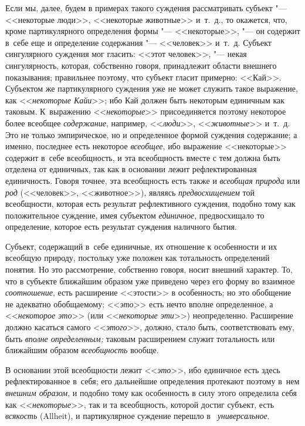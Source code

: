 Если мы, далее, будем в примерах такого суждения рассматривать субъект "---
<<некоторые люди>>, <<некоторые животные>> и~т.~д., то окажется, что, кроме
партикулярного определения формы "--- <<некоторые>>, "--- он содержит в~себе
еще и определение содержания "--- <<человек>> и~т.~д. Субъект сингулярного
суждения мог гласить: <<этот человек>>, "--- некая сингулярность, которая,
собственно говоря, принадлежит области внешнего показывания; правильнее
поэтому, что субъект гласит примерно: <<Кай>>. Субъектом же партикулярного
суждения уже не может служить такое выражение, как <<{\em некоторые Кайи}>>;
ибо Кай должен быть некоторым единичным как таковым. К~выражению
<<{\em некоторые}>> присоединяется поэтому некоторое более всеобщее
{\em содержание}, например, <<{\em люди}>>, <<{\em животные}>> и~т.~д. Это
не только эмпирическое, но и определенное формой суждения содержание; а именно,
последнее есть некоторое {\em всеобщее}, ибо выражение <<некоторые>> содержит
в~себе всеобщность, и эта всеобщность вместе с тем должна быть отделена от
единичных, так как в основании лежит рефлектированная единичность. Говоря
точнее, эта всеобщность есть также и {\em всеобщая природа} или {\em род}
(<<человек>>, <<животное>>), являясь {\em предвосхищением} той всеобщности,
которая есть результат рефлективного суждения, подобно тому как положительное
суждение, имея субъектом {\em единичное}, предвосхищало то определение, которое
есть результат суждения наличного бытия.

Субъект, содержащий в~себе единичные, их отношение к особенности и их всеобщую
природу, постольку уже положен как тотальность определений понятия. Но это
рассмотрение, собственно говоря, носит внешний характер. То, что в субъекте
ближайшим образом уже приведено через его форму во взаимное {\em соотношение},
есть расширение <<этости>> в особенность; но это обобщение не адекватно
обобщаемому; <<{\em это}>> есть нечто вполне определенное, а <<{\em некоторое
это}>> (или <<{\em некоторые эти}>>) неопределенно. Расширение должно касаться
самого <<{\em этого}>>, должно, стало быть, соответствовать ему, быть
{\em вполне определенным;} таковым расширением служит тотальность или
ближайшим образом {\em всеобщность} вообще.

В основании этой всеобщности лежит <<{\em это}>>, ибо единичное есть здесь
рефлектированное в~себя; его дальнейшие определения протекают поэтому в~нем
{\em внешним образом}, и подобно тому как особенность в силу этого определила
себя как <<{\em некоторые}>>, так и та всеобщность, которой достиг субъект,
есть {\em всякость} (Allheit), и партикулярное суждение перешло в~{\em
универсальное}.

